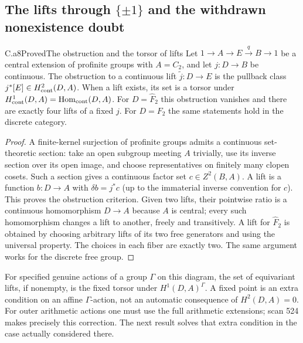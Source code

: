 \subsection{The lifts through $\{\pm1\}$ and the withdrawn nonexistence doubt}

\begin{claim}{C.a8}{Proved}{The obstruction and the torsor of lifts}
Let $1\to A\to E\xrightarrow{q}B\to1$ be a central extension of
profinite groups with $A=C_2$, and let $j:D\to B$ be continuous.
The obstruction to a continuous lift $\widetilde j:D\to E$ is the
pullback class $j^*[E]\in H^2_{\rm cont}(D,A)$. When a lift exists,
its set is a torsor under $H^1_{\rm cont}(D,A)=\operatorname{Hom}_{\rm cont}(D,A)$.
For $D=\widehat F_2$ this obstruction vanishes and there are exactly
four lifts of a fixed $j$. For $D=F_2$ the same statements hold in the
discrete category.
\end{claim}

\begin{proof}
A finite-kernel surjection of profinite groups admits a continuous
set-theoretic section: take an open subgroup meeting $A$ trivially,
use its inverse section over its open image, and choose representatives
on finitely many clopen cosets. Such a section gives a continuous factor
set $c\in Z^2(B,A)$. A lift is a function $b:D\to A$ with
$\delta b=j^*c$ (up to the immaterial inverse convention for $c$).
This proves the obstruction criterion. Given two lifts, their pointwise
ratio is a continuous homomorphism $D\to A$ because $A$ is central;
every such homomorphism changes a lift to another, freely and
transitively. A lift for $\widehat F_2$ is obtained by choosing
arbitrary lifts of its two free generators and using the universal
property. The choices in each fiber are exactly two. The same argument
works for the discrete free group.
\end{proof}
For specified genuine actions of a group $\Gamma$ on this diagram, the
set of equivariant lifts, if nonempty, is the fixed torsor under
$H^1(D,A)^\Gamma$. A fixed point is an extra condition on an affine
$\Gamma$-action, not an automatic consequence of $H^2(D,A)=0$.
For outer arithmetic actions one must use the full arithmetic extensions;
scan 524 makes precisely this correction. The next result solves that
extra condition in the case actually considered there.

